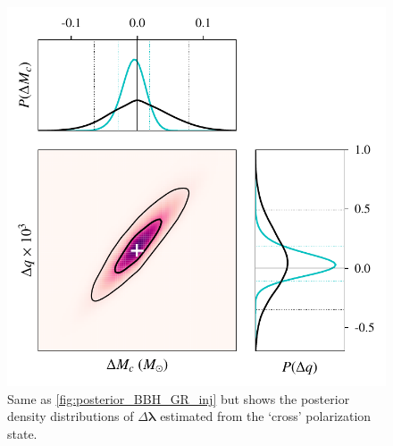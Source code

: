 \documentclass[prd,preprintnumbers,twocolumn,eqsecnum,floatfix,a4paper,nofootinbib,superscriptaddress]{revtex4}
\newcommand{\blambda}{\bm{\lambda}}
\begin{document}
 \begin{figure}[tbh]
 	\begin{center}
 		\includegraphics[scale=0.7]{figs/hp_hc_M_80_q_9_SNR_25.pdf}
 	\end{center} 
 	\caption{ Same as \ref{fig:posterior_BBH_GR_inj} but shows the posterior density distributions of $\Delta \blambda$ estimated from the `cross' polarization state.}
 	\label{fig:hp_hc_GR}
 \end{figure}
\end{document}
